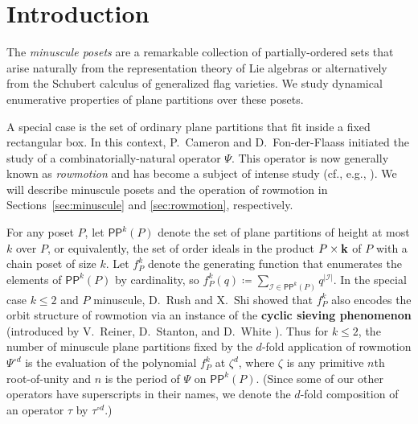 \documentclass[12pt]{amsart}
\theoremstyle{definition}
\theoremstyle{remark}
\numberwithin{equation}{section}
\newcommand{\pp}{\ensuremath{\mathsf{PP}}}
\begin{document}
\maketitle


%
\section{Introduction}
%
\label{sec:introduction}

The \emph{minuscule posets} are a remarkable collection of partially-ordered sets that arise naturally from the representation theory of Lie algebras or alternatively from the Schubert calculus of generalized flag varieties. We study dynamical enumerative properties of plane partitions over these posets.

A special case is the set of ordinary plane partitions that fit inside a fixed rectangular box. In this context, P.~Cameron and D.~Fon-der-Flaass \cite{Cameron.Fonderflaass} initiated the study of a combinatorially-natural operator $\Psi$. This operator is now generally known as \emph{rowmotion} and has become a subject of intense study (cf., e.g., \cite{Panyushev,Striker.Williams,Armstrong.Stump.Thomas,Rush.Shi,Einstein.Propp,Propp.Roby,Grinberg.Roby:2,Grinberg.Roby:1,DPS,Vorland, Dilks.Striker.Vorland}).
We will describe minuscule posets and the operation of rowmotion in Sections~\ref{sec:minuscule} and \ref{sec:rowmotion}, respectively.

For any poset $P$, let $\pp^k(P)$ denote the set of plane partitions of height at most $k$ over $P$, or equivalently, the set of order ideals in the product $P \times {\bf k}$ of $P$ with a chain poset of size $k$. Let $f_P^k$ denote the generating function that enumerates the elements of $\pp^k(P)$  by cardinality, so 
$f_P^k(q) \coloneqq \sum_{\mathcal{I} \in \pp^k(P)} q^{|\mathcal{I}|}.$ In the special case $k \leq 2$ and $P$ minuscule, D.~Rush and X.~Shi \cite{Rush.Shi} showed that $f_P^k$ also encodes the orbit structure of rowmotion via an instance of the {\bf cyclic sieving phenomenon} (introduced by V.~Reiner, D.~Stanton, and D.~White \cite{Reiner.Stanton.White}). Thus for $k \leq 2$, the number of minuscule plane partitions fixed by the $d$-fold application of rowmotion $\Psi^{\circ d}$ is the evaluation of the polynomial $f_P^k$ at $\zeta^d$, where $\zeta$ is any primitive $n$th root-of-unity and $n$ is the period of $\Psi$ on $\pp^k(P)$. (Since some of our other operators have superscripts in their names, we denote the $d$-fold composition of an operator $\tau$ by $\tau^{\circ d}$.)
\end{document}
